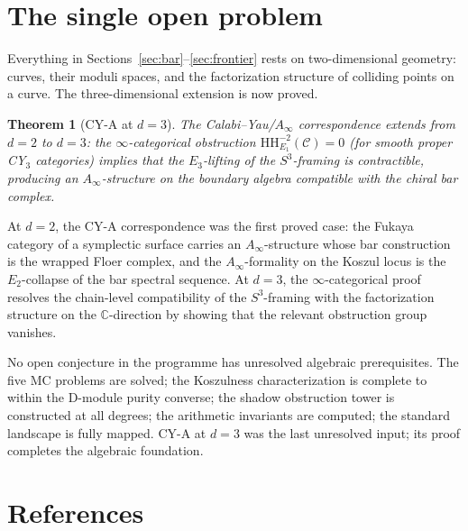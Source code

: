 \documentclass[11pt,reqno]{amsart}
\newtheorem{theorem}{Theorem}[section]
\theoremstyle{definition}
\theoremstyle{remark}
\numberwithin{equation}{section}
\begin{document}
\section{The single open problem}
\label{sec:open-problem}

Everything in Sections~\ref{sec:bar}--\ref{sec:frontier}
rests on two-dimensional geometry: curves, their moduli
spaces, and the factorization structure of colliding points
on a curve. The three-dimensional extension is now proved.

\begin{theorem}[CY-A at $d = 3$]\label{thm:cy-a3}
The Calabi--Yau/$A_\infty$ correspondence extends from
$d = 2$ to $d = 3$: the $\infty$-categorical obstruction
$\mathrm{HH}^{-2}_{E_1}(\mathcal{C}) = 0$ (for smooth proper
CY$_3$ categories) implies that the $E_3$-lifting of the
$S^3$-framing is contractible, producing an
$A_\infty$-structure on the boundary algebra compatible
with the chiral bar complex.
\end{theorem}

At $d = 2$, the CY-A correspondence was the first proved
case: the Fukaya category of a symplectic surface carries an
$A_\infty$-structure whose bar construction is the wrapped
Floer complex, and the $A_\infty$-formality on the Koszul
locus is the $E_2$-collapse of the bar spectral sequence.
At $d = 3$, the $\infty$-categorical proof resolves the
chain-level compatibility of the $S^3$-framing with
the factorization structure on the $\mathbb{C}$-direction
by showing that the relevant obstruction group vanishes.

No open conjecture in the programme has unresolved
algebraic prerequisites. The five MC problems are solved;
the Koszulness characterization is complete to within
the D-module purity converse; the shadow obstruction tower
is constructed at all degrees; the arithmetic invariants
are computed; the standard landscape is fully mapped.
CY-A at $d = 3$ was the last unresolved input; its proof
completes the algebraic foundation.


\section*{References}
\label{sec:references}
\end{document}
